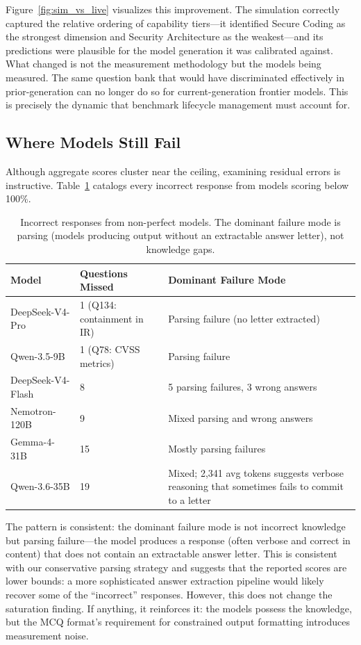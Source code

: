\documentclass[journal]{IEEEtran}
\begin{document}
Figure~\ref{fig:sim_vs_live} visualizes this improvement. The simulation correctly captured the relative ordering of capability tiers---it identified Secure Coding as the strongest dimension and Security Architecture as the weakest---and its predictions were plausible for the model generation it was calibrated against. What changed is not the measurement methodology but the models being measured. The same question bank that would have discriminated effectively in prior-generation can no longer do so for current-generation frontier models. This is precisely the dynamic that benchmark lifecycle management must account for.

\subsection{Where Models Still Fail}

Although aggregate scores cluster near the ceiling, examining residual errors is instructive. Table~\ref{tab:failures} catalogs every incorrect response from models scoring below 100\%.

\begin{table}[t]
\centering
\caption{Incorrect responses from non-perfect models. The dominant failure mode is parsing (models producing output without an extractable answer letter), not knowledge gaps.}
\label{tab:failures}
\scriptsize
\begin{tabular}{llp{4.5cm}}
\toprule
\textbf{Model} & \textbf{Questions Missed} & \textbf{Dominant Failure Mode} \\
\midrule
DeepSeek-V4-Pro & 1 (Q134: containment in IR) & Parsing failure (no letter extracted) \\
Qwen-3.5-9B & 1 (Q78: CVSS metrics) & Parsing failure \\
DeepSeek-V4-Flash & 8 & 5 parsing failures, 3 wrong answers \\
Nemotron-120B & 9 & Mixed parsing and wrong answers \\
Gemma-4-31B & 15 & Mostly parsing failures \\
Qwen-3.6-35B & 19 & Mixed; 2,341 avg tokens suggests verbose reasoning that sometimes fails to commit to a letter \\
\bottomrule
\end{tabular}
\end{table}

The pattern is consistent: the dominant failure mode is not incorrect knowledge but parsing failure---the model produces a response (often verbose and correct in content) that does not contain an extractable answer letter. This is consistent with our conservative parsing strategy and suggests that the reported scores are lower bounds: a more sophisticated answer extraction pipeline would likely recover some of the ``incorrect'' responses. However, this does not change the saturation finding. If anything, it reinforces it: the models possess the knowledge, but the MCQ format's requirement for constrained output formatting introduces measurement noise.
\end{document}
